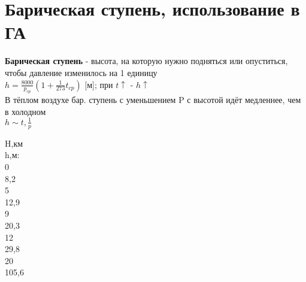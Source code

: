 
\section{Барическая ступень, использование в ГА}
\textbf{Барическая ступень} - высота, на которую нужно подняться или опуститься, чтобы давление изменилось на 1 единицу\\ 
$h=\frac{8000}{p_{cp}}(1+\frac{1}{273}t_{cp})$ [м]; при $t\uparrow$ - $h\uparrow$\\ 
В тёплом воздухе бар. ступень с уменьшением P с высотой идёт медленнее, чем в холодном \\ 
$h \sim t, \frac{1}{p}$ 

\begin{multicols*}{6} 
	H,км\\	h,м:\\ 
	0\\ 8,2\\
	5 \\ 12,9\\
	9 \\ 20,3\\
	12 \\ 29,8\\
	20 \\ 105,6
\end{multicols*} 
